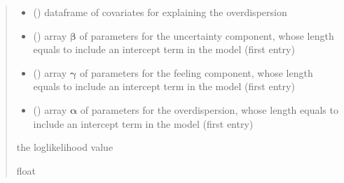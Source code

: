 \documentclass[letterpaper,10pt,english]{sphinxmanual}
\begin{document}
\begin{fulllineitems}
\begin{quote}
\begin{description}
\begin{itemize}
\item {} 
\sphinxAtStartPar
{} () \textendash{} dataframe of covariates for explaining the overdispersion

\item {} 
\sphinxAtStartPar
{} () \textendash{} array \(\pmb \beta\) of parameters for the uncertainty component, whose length equals 
 to include an intercept term in the model (first entry)

\item {} 
\sphinxAtStartPar
{} () \textendash{} array \(\pmb \gamma\) of parameters for the feeling component, whose length equals 
 to include an intercept term in the model (first entry)

\item {} 
\sphinxAtStartPar
{} () \textendash{} array \(\pmb \alpha\) of parameters for the overdispersion, whose length equals 
 to include an intercept term in the model (first entry)

\end{itemize}

\sphinxAtStartPar
the log\sphinxhyphen{}likelihood value

\sphinxAtStartPar
float

\end{description}\end{quote}

\end{fulllineitems}

\end{document}

